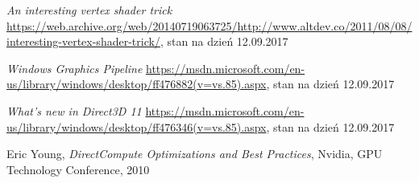 \begin{thebibliography}{999}
 \emph{An interesting vertex shader trick} \url{https://web.archive.org/web/20140719063725/http://www.altdev.co/2011/08/08/interesting-vertex-shader-trick/}, stan na dzień 12.09.2017

 \emph{Windows Graphics Pipeline} \url{https://msdn.microsoft.com/en-us/library/windows/desktop/ff476882(v=vs.85).aspx}, stan na dzień 12.09.2017

 \emph{What's new in Direct3D 11} \url{https://msdn.microsoft.com/en-us/library/windows/desktop/ff476346(v=vs.85).aspx}, stan na dzień 12.09.2017

 Eric Young, \emph{DirectCompute Optimizations and Best Practices}, Nvidia, GPU Technology Conference, 2010

\end{thebibliography}
